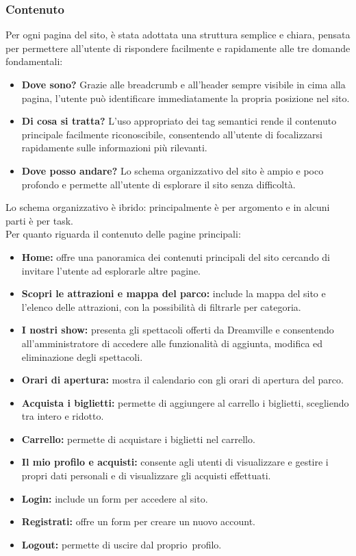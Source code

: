 \subsubsection{Contenuto}
Per ogni pagina del sito, è stata adottata una struttura semplice e chiara, pensata per permettere all'utente di rispondere facilmente e rapidamente alle tre domande fondamentali:
\begin{itemize}
    \item \textbf{Dove sono?} Grazie alle breadcrumb e all'header sempre visibile in cima alla pagina, l'utente può identificare immediatamente la propria posizione nel sito.
    \item \textbf{Di cosa si tratta?} L'uso appropriato dei tag semantici rende il contenuto principale facilmente riconoscibile, consentendo all'utente di focalizzarsi rapidamente sulle informazioni più rilevanti.
    \item \textbf{Dove posso andare?} Lo schema organizzativo del sito è ampio e poco profondo e permette all'utente di esplorare il sito senza difficoltà.
\end{itemize}
Lo schema organizzativo è ibrido: principalmente è per argomento e in alcuni parti è per task.\\
Per quanto riguarda il contenuto delle pagine principali:
\begin{itemize}
    \item \textbf{Home:} offre una panoramica dei contenuti principali del sito cercando di invitare l'utente ad esplorarle altre pagine.
    \item \textbf{Scopri le attrazioni e mappa del parco:} include la mappa del sito e l'elenco delle attrazioni, con la possibilità di filtrarle per categoria.
    \item \textbf{I nostri show:} presenta gli spettacoli offerti da Dreamville e consentendo all'amministratore di accedere alle funzionalità di aggiunta, modifica ed eliminazione degli spettacoli.
    \item \textbf{Orari di apertura:} mostra il calendario con gli orari di apertura del parco.
    \item \textbf{Acquista i biglietti:} permette di aggiungere al carrello i biglietti, scegliendo tra intero e ridotto.
    \item \textbf{Carrello:} permette di acquistare i biglietti nel carrello.
    \item \textbf{Il mio profilo e acquisti:} consente agli utenti di visualizzare e gestire i propri dati personali e di visualizzare gli acquisti effettuati.
    \item \textbf{Login:} include un form per accedere al sito.
    \item \textbf{Registrati:} offre un form per creare un nuovo account.
    \item \textbf{Logout:} permette di uscire dal proprio profilo.
\end{itemize}
